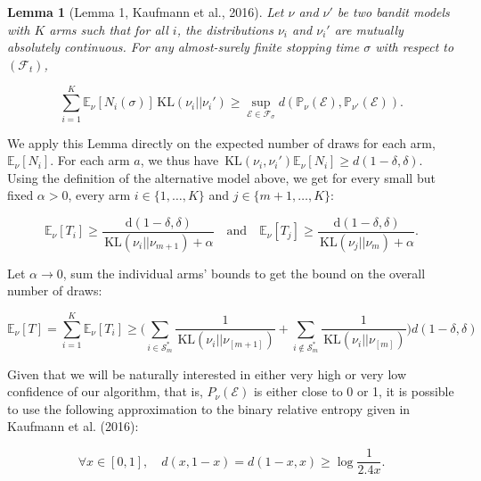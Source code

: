 \documentclass[11pt,]{article}
\newtheorem{lemma}{Lemma}
\newcommand{\KL}{\,\text{KL}}
\newcommand{\der}{\,\text{d}}
\begin{document}
\begin{lemma}[Lemma 1, Kaufmann et al., 2016] \label{theorem:KaufmannEtAlLemma1}
Let $\nu$ and $\nu'$ be two bandit models with $K$ arms such that for all $i$, the distributions $\nu_i$ and $\nu_i'$ are mutually absolutely continuous. For any almost-surely finite stopping time $\sigma$ with respect to $(\mathcal{F}_t)$,

\begin{equation*}
\sum_{i=1}^{K} \mathbb{E}_{\nu} [N_i(\sigma)] \KL(\nu_i|| \nu_i') \geq \sup_{\mathcal{E} \in \mathcal{F}_{\sigma}} d(\mathbb{P}_{\nu}(\mathcal{E}), \mathbb{P}_{\nu'}(\mathcal{E})).
\end{equation*}
\end{lemma}

We apply this Lemma directly on the expected number of draws for each
arm, \(\mathbb{E}_{\nu}[N_i]\). For each arm \(a\), we thus have
\(\KL(\nu_i, \nu_i') \mathbb{E}_{\nu}[N_i] \geq d(1-\delta, \delta)\).
Using the definition of the alternative model above, we get for every
small but fixed \(\alpha > 0\), every arm \(i \in \{1, \dots, K\}\) and
\(j \in \{m+1, \dots, K\}\):

\begin{equation*}
\mathbb{E}_{\nu}[T_i] \geq \frac{\der(1-\delta, \delta)}{\KL (\nu_i || \nu_{m+1}) + \alpha} \quad \text{and} \quad \mathbb{E}_{\nu}[T_j] \geq \frac{\der(1-\delta, \delta)}{\KL (\nu_j || \nu_{m}) + \alpha}.
\end{equation*}

Let \(\alpha \to 0\), sum the individual arms' bounds to get the bound
on the overall number of draws:

\begin{equation*}
\mathbb{E}_{\nu}[T] = \sum_{i=1}^K \mathbb{E}_{\nu}[T_i] \geq \Big( \sum_{i \in \mathcal{S}_m^*} \frac{1}{\KL(\nu_i|| \nu_{[m+1]})} + \sum_{i \notin \mathcal{S}_m^*} \frac{1}{\KL(\nu_i|| \nu_{[m]})} \Big) d(1-\delta, \delta)
\end{equation*}

Given that we will be naturally interested in either very high or very
low confidence of our algorithm, that is, \(P_\nu(\mathcal{E})\) is
either close to 0 or 1, it is possible to use the following
approximation to the binary relative entropy given in Kaufmann et al.
(2016):

\begin{equation}\label{bre_approx}
\forall x \in [0,1], \quad d(x,1-x) = d(1-x,x) \geq \log \frac{1}{2.4x}.
\end{equation}
\end{document}
